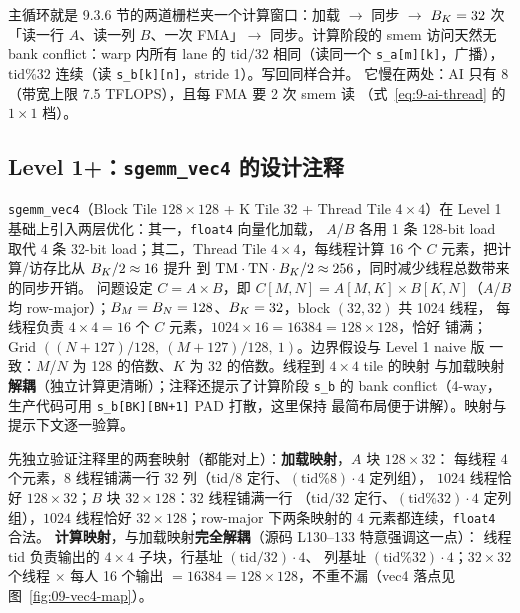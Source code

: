 

主循环就是 9.3.6 节的两道栅栏夹一个计算窗口：加载 $\to$ 同步 $\to$
$B\sb{K}=32$ 次「读一行 $A$、读一列 $B$、一次 FMA」$\to$ 同步。计算阶段的
smem 访问天然无 bank conflict：warp 内所有 lane 的
$\mathrm{tid}/32$ 相同（读同一个 \texttt{s\_a[m][k]}，广播），
$\mathrm{tid}\%32$ 连续（读 \texttt{s\_b[k][n]}，stride 1）。写回同样合并。
它慢在两处：AI 只有 8（带宽上限 7.5 TFLOPS），且每 FMA 要 2 次 smem 读
（式~\ref{eq:9-ai-thread} 的 $1 \times 1$ 档）。

\subsection{Level 1+：\texttt{sgemm\_vec4} 的设计注释}

\texttt{sgemm\_vec4}（Block Tile $128\times128$ + K Tile 32 + Thread Tile
$4\times4$）在 Level 1 基础上引入两层优化：其一，\texttt{float4} 向量化加载，
$A$/$B$ 各用 1 条 128-bit load 取代 4 条 32-bit load；其二，Thread Tile
$4\times4$，每线程计算 16 个 $C$ 元素，把计算/访存比从 $B\sb{K}/2\approx16$ 提升
到 $\mathrm{TM}\cdot\mathrm{TN}\cdot B\sb{K}/2\approx256$，同时减少线程总数带来的同步开销。
问题设定 $C = A \times B$，即 $C[M,N] = A[M,K] \times B[K,N]$（$A$/$B$ 均
row-major）；$B\sb{M}=B\sb{N}=128$、$B\sb{K}=32$，block $(32,32)$ 共 1024 线程，
每线程负责 $4\times4=16$ 个 $C$ 元素，$1024\times16=16384=128\times128$，恰好
铺满；Grid $((N+127)/128,\ (M+127)/128,\ 1)$。边界假设与 Level 1 naive 版
一致：$M$/$N$ 为 128 的倍数、$K$ 为 32 的倍数。线程到 $4\times4$ tile 的映射
与加载映射\textbf{解耦}（独立计算更清晰）；注释还提示了计算阶段 \texttt{s\_b} 的
bank conflict（4-way，生产代码可用 \texttt{s\_b[BK][BN+1]} PAD 打散，这里保持
最简布局便于讲解）。映射与提示下文逐一验算。

先独立验证注释里的两套映射（都能对上）：\textbf{加载映射}，$A$ 块 $128 \times 32$：
每线程 4 个元素，$8$ 线程铺满一行 32 列（$\mathrm{tid}/8$ 定行、$(\mathrm{tid}\%8) \cdot 4$ 定列组），
$1024$ 线程恰好 $128 \times 32$；$B$ 块 $32 \times 128$：$32$ 线程铺满一行
（$\mathrm{tid}/32$ 定行、$(\mathrm{tid}\%32) \cdot 4$ 定列组），$1024$ 线程恰好
$32 \times 128$；row-major 下两条映射的 4 元素都连续，\texttt{float4} 合法。
\textbf{计算映射}，与加载映射\textbf{完全解耦}（源码 L130--133 特意强调这一点）：
线程 $\mathrm{tid}$ 负责输出的 $4 \times 4$ 子块，行基址 $(\mathrm{tid}/32) \cdot 4$、
列基址 $(\mathrm{tid}\%32) \cdot 4$；$32 \times 32$ 个线程 $\times$ 每人 16 个输出
$= 16384 = 128 \times 128$，不重不漏（vec4 落点见图~\ref{fig:09-vec4-map}）。

